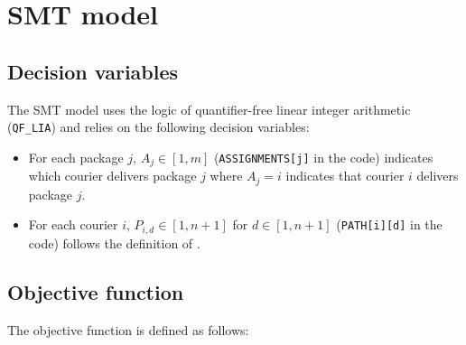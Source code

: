 \section{SMT model}


\subsection{Decision variables}

The SMT model uses the logic of quantifier-free linear integer arithmetic (\texttt{QF\_LIA}) and relies on the following decision variables:

\begin{itemize}
    \item For each package $j$, $A_j \in [1, m]$ (\texttt{ASSIGNMENTS[j]} in the code) indicates which courier delivers package $j$ where $A_j = i$ indicates that courier $i$ delivers package $j$.
    
    \item For each courier $i$, $P_{i,d} \in [1, n+1]$ for $d \in [1, n+1]$ (\texttt{PATH[i][d]} in the code) follows the definition of .

\end{itemize}





\subsection{Objective function}
The objective function is defined as follows:


